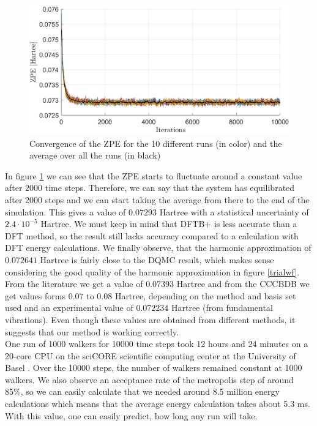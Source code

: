 \documentclass [12pt]{report}
\begin{document}
\begin{figure}[h!]
\includegraphics[width=\linewidth] {c2h6_1.png}
\caption{Convergence of the ZPE for the 10 different runs (in color) and the average over all the runs (in black)} \label{c2h6_1}
\end{figure}
In figure \ref{c2h6_1} we can see that the ZPE starts to fluctuate around a constant value after $2000$ time steps. Therefore, we can say that the system has equilibrated after $2000$ steps and we can start taking the average from there to the end of the simulation. This gives a value of $0.07293$ Hartree with a statistical uncertainty  of $2.4 \cdot 10^{-5}$ Hartree. We must keep in mind that DFTB+ is less accurate than a DFT method, so the result still lacks accuracy compared to a calculation with DFT energy calculations. We finally observe, that the harmonic approximation of $0.072641$ Hartree is fairly close to the DQMC result, which makes sense considering the good quality of the harmonic approximation in figure \ref{trialwf}. From the literature \cite{c2h6} we get a value of $0.07393$ Hartree and from the CCCBDB \cite{cccbdb} we get values forms $0.07$ to $0.08$ Hartree, depending on the method and basis set used and an experimental value of $0.072234$ Hartree (from fundamental vibrations). Even though these values are obtained from different methods, it suggests that our method is working correctly.\\
One run of 1000 walkers for 10000 time steps took 12 hours and 24 minutes on a 20-core CPU on the sciCORE scientific computing center at the University of Basel \cite{http://scicore.unibas.ch/}. Over the 10000 steps, the number of walkers remained constant at 1000 walkers.  We also observe an acceptance rate of the metropolis step of around 85\%, so we can easily calculate that we needed around 8.5 million energy calculations which means that the average energy calculation takes about 5.3 ms. With this value, one can easily predict, how long any run will take. 
\end{document}
